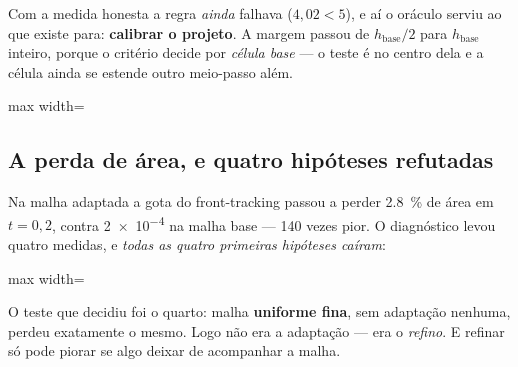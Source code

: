 Com a medida honesta a regra \emph{ainda} falhava ($4{,}02 < 5$), e a\'i o
or\'aculo serviu ao que existe para: \textbf{calibrar o projeto}. A margem
passou de $h_{\text{base}}/2$ para $h_{\text{base}}$ inteiro, porque o
crit\'erio decide por \emph{c\'elula base} --- o teste \'e no centro dela e a
c\'elula ainda se estende outro meio-passo al\'em.

\begin{adjustbox}{max width=\linewidth}
\end{adjustbox}

\subsection{A perda de \'area, e quatro hip\'oteses refutadas}
\label{sec:amr-area}

Na malha adaptada a gota do front-tracking passou a perder \SI{2.8}{\percent} de
\'area em $t=0{,}2$, contra \num{2e-4} na malha base --- 140 vezes pior. O
diagn\'ostico levou quatro medidas, e \emph{todas as quatro primeiras
hip\'oteses caíram}:

\begin{adjustbox}{max width=\linewidth}
\end{adjustbox}

O teste que decidiu foi o quarto: malha \textbf{uniforme fina}, sem
adapta\c{c}\~ao nenhuma, perdeu exatamente o mesmo. Logo n\~ao era a
adapta\c{c}\~ao --- era o \emph{refino}. E refinar s\'o pode piorar se algo
deixar de acompanhar a malha.

